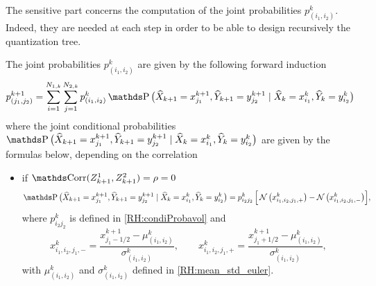The sensitive part concerns the computation of the joint probabilities $p_{(i_1,i_2)}^k$. Indeed, they are needed at each step in order to be able to design recursively the quantization tree.
\begin{lemme}
	The joint probabilities $p_{(i_1,i_2)}^k$ are given by the following forward induction
	\begin{equation}\label{RH:joint_proba_couple}
		p_{(j_1,j_2)}^{k+1}
		= \sum_{i=1}^{N_{1,k}} \sum_{j=1}^{N_{2,k}} p_{(i_1,i_2)}^k \Prob \big( \widehat X_{k+1} = x_{j_1}^{k+1}, \widehat Y_{k+1} = y_{j_2}^{k+1} \mid \widehat X_k = x_{i_1}^k, \widehat Y_k = y_{i_2}^k \big)
	\end{equation}
	where the joint conditional probabilities $\Prob \big( \widehat X_{k+1} = x_{j_1}^{k+1}, \widehat Y_{k+1} = y_{j_2}^{k+1} \mid \widehat X_k = x_{i_1}^k, \widehat Y_k = y_{i_2}^k \big)$ are given by the formulas below, depending on the correlation
	\begin{itemize}[wide=0pt]
		\item if $\Corr(Z_{k+1}^1, Z_{k+1}^2) = \rho = 0$
		      \begin{equation}
			      \Prob \big( \widehat X_{k+1} = x_{j_1}^{k+1}, \widehat Y_{k+1} = y_{j_2}^{k+1} \mid \widehat X_k = x_{i_1}^k, \widehat Y_k = y_{i_2}^k \big) = p_{i_2 j_2}^k \, \Big[ \N \big( x_{i_1,i_2,j_1,+}^{k} \big) - \N \big( x_{i_1,i_2,j_1,-}^{k} \big) \Big],
		      \end{equation}
		      where $p_{i_2 j_2}^k$ is defined in \eqref{RH:condiProbavol} and
		      \begin{equation}
			      x_{i_1,i_2,j_1,-}^{k} = \frac{x_{j_1-1/2}^{k+1} - \mu_{(i_1,i_2)}^k }{\sigma_{(i_1,i_2)}^k},\qquad x_{i_1,i_2,j_1,+}^{k} = \frac{x_{j_1+1/2}^{k+1} - \mu_{(i_1,i_2)}^k }{\sigma_{(i_1,i_2)}^k},
		      \end{equation}
		      with $\mu_{(i_1,i_2)}^k$ and $\sigma_{(i_1,i_2)}^k$ defined in \eqref{RH:mean_std_euler}.


\end{itemize}
\end{lemme}
